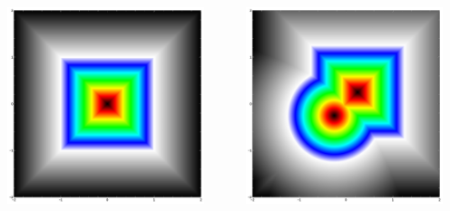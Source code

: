 \documentclass{beamer}
\begin{document}
\begin{frame}[fragile]
\begin{columns}
\begin{column}{0.33\textwidth}
    \includegraphics[width=0.9\textwidth, center]{implicit_square.jpg}
  \end{column}
  \begin{column}{0.33\textwidth}
    \includegraphics[width=0.9\textwidth, center]{implicit_union_square_circle.jpg}
  \end{column}
\end{columns}
\end{frame}
\end{document}
